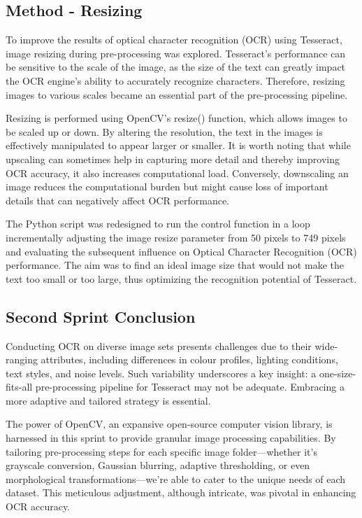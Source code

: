 \subsection*{Method - Resizing}

To improve the results of optical character recognition (OCR) using Tesseract, image resizing during pre-processing was explored. Tesseract's performance can be sensitive to the scale of the image, as the size of the text can greatly impact the OCR engine's ability to accurately recognize characters. Therefore, resizing images to various scales became an essential part of the pre-processing pipeline.

Resizing is performed using OpenCV's resize() function, which allows images to be scaled up or down. By altering the resolution, the text in the images is effectively manipulated to appear larger or smaller. It is worth noting that while upscaling can sometimes help in capturing more detail and thereby improving OCR accuracy, it also increases computational load. Conversely, downscaling an image reduces the computational burden but might cause loss of important details that can negatively affect OCR performance. \cite{dasCovid19FaceMask2020}


The Python script was redesigned to run the control function in a loop incrementally adjusting the image resize parameter from 50 pixels to 749 pixels and evaluating the subsequent influence on Optical Character Recognition (OCR) performance. The aim was to find an ideal image size that would not make the text too small or too large, thus optimizing the recognition potential of Tesseract.


\subsection{Second Sprint Conclusion}

Conducting OCR on diverse image sets presents challenges due to their wide-ranging attributes, including differences in colour profiles, lighting conditions, text styles, and noise levels. Such variability underscores a key insight: a one-size-fits-all pre-processing pipeline for Tesseract may not be adequate. Embracing a more adaptive and tailored strategy is essential.

The power of OpenCV, an expansive open-source computer vision library, is harnessed in this sprint to provide granular image processing capabilities. By tailoring pre-processing steps for each specific image folder—whether it's grayscale conversion, Gaussian blurring, adaptive thresholding, or even morphological transformations—we're able to cater to the unique needs of each dataset. This meticulous adjustment, although intricate, was pivotal in enhancing OCR accuracy.


